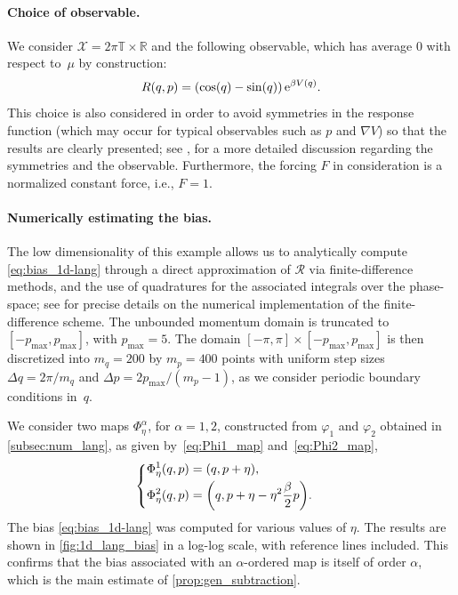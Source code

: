 \documentclass[11pt]{article}
\newcommand{\T}{\mathbb{T}}
\newcommand{\R}{\mathbb{R}}
\newcommand{\e}{\mathrm{e}}
\DeclarePairedDelimiter\paren{\lparen}{\rparen}
\theoremstyle{definition}
\let\oldparagraph=\paragraph
\renewcommand\paragraph[1]{\oldparagraph{#1.}}
\begin{document}
\paragraph{Choice of observable} We consider $\mathcal{X} = 2\pi \T \times \R$ and the following observable, which has average 0 with respect to~$\mu$ by construction: 
\begin{equation}
\notag
	R(q,p) = \paren*{\cos(q) - \sin(q)} \, \e^{\beta V(q)}.
\end{equation}
This choice is also considered in order to avoid symmetries in the response function (which may occur for typical observables such as $p$ and $\nabla V$) so that the results are clearly presented; see \cite[Section~4.2]{spacek2023}, for a more detailed discussion regarding the symmetries and the observable. Furthermore, the forcing $F$ in consideration is a normalized constant force, i.e., $F = 1$.

\paragraph{Numerically estimating the bias} The low dimensionality of this example allows us to analytically compute \eqref{eq:bias_1d-lang} through a direct approximation of $\mathcal{R}$ via finite-difference methods, and the use of quadratures for the associated integrals over the phase-space; see \cite[Appendix B]{spacek2023} for precise details on the numerical implementation of the finite-difference scheme. The unbounded momentum domain is truncated to $[-p_\mathrm{max},p_\mathrm{max}]$, with $p_\mathrm{max} = 5$. The domain $[-\pi,\pi] \times [-p_\mathrm{max},p_\mathrm{max}]$ is then discretized into $m_q = 200$ by $m_p = 400$ points with uniform step sizes $\Delta q = 2\pi/m_q$ and $\Delta p = 2p_\mathrm{max}/(m_p-1)$, as we consider periodic boundary conditions in~$q$.

We consider two maps $\Phi_\eta^\alpha$, for $\alpha=1,2$, constructed from $\varphi_1$ and $\varphi_2$ obtained in \cref{subsec:num_lang}, as given by~\eqref{eq:Phi1_map} and~\eqref{eq:Phi2_map},
\begin{equation}
\notag
\begin{cases}
\begin{aligned}
	&\Phi_\eta^1(q,p) = (q, p + \eta), \\
	&\Phi_\eta^2(q,p) = \paren[\bigg]{q, p + \eta - \eta^2\frac{\beta}{2}p}.
\end{aligned}
\end{cases}
\end{equation}
The bias \eqref{eq:bias_1d-lang} was computed for various values of $\eta$. The results are shown in \cref{fig:1d_lang_bias} in a log-log scale, with reference lines included. This confirms that the bias associated with an $\alpha$-ordered map is itself of order $\alpha$, which is the main estimate of \cref{prop:gen_subtraction}.
\end{document}
